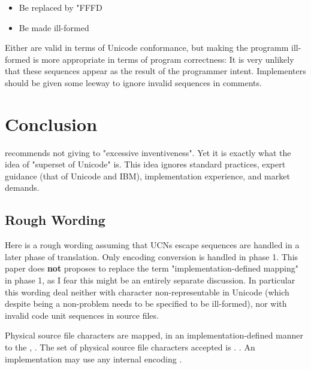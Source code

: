 \documentclass{wg21}
\begin{document}
\begin{itemize}
\item Be replaced by \char"FFFD
\item Be made ill-formed
\end{itemize}

Either are valid in terms of Unicode conformance, but making the programm ill-formed is more appropriate in terms of program correctness:
It is very unlikely that these sequences appear as the result of the programmer intent.
Implementers should be given some leeway to ignore invalid sequences in comments. 

\section{Conclusion}

 recommends not giving to "excessive inventiveness". Yet it is exactly what the idea of "superset of Unicode" is.
This idea ignores standard practices, expert guidance (that of Unicode and IBM), implementation experience, and market demands.

\subsection{Rough Wording}

Here is a rough wording assuming that UCNs escape sequences are handled in a later phase of translation.
Only encoding conversion is handled in phase 1.
This paper does \textbf{not} proposes to replace the term "implementation-defined mapping" in phase 1,
as I fear this might be an entirely separate discussion.
In particular this wording deal neither with character non-representable in Unicode (which despite being a non-problem needs to be specified to be ill-formed),
nor with invalid code unit sequences in source files.

\begin{itemdescr}
Physical source file characters are mapped, in an implementation-defined manner to the ,
 .
The set of physical source file characters accepted is .
. An implementation may use any internal
encoding .
\end{itemdescr}
\end{document}
